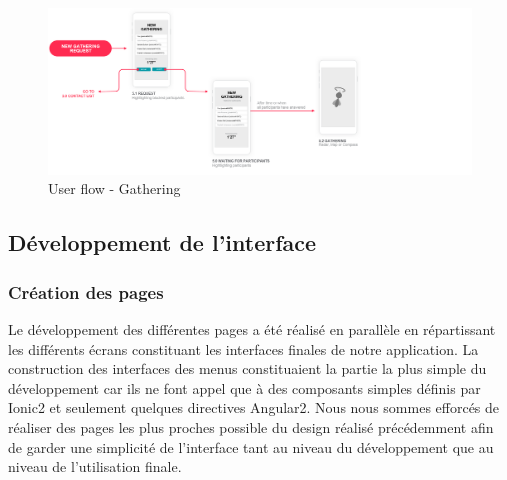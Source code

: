 \documentclass[french]{article}
\begin{document}
	\begin{figure}[H]
		\centering
		\includegraphics[scale=0.6]{../user-flow/user-flow-5.png}
		\caption{User flow - Gathering}
		\label{User flow - Gathering}
	\end{figure}
	
	
	\subsection{Développement de l'interface}
	\subsubsection{Création des pages}
	
	Le développement des différentes pages a été réalisé en parallèle en répartissant les différents écrans constituant les interfaces finales de notre application.
	La construction des interfaces des menus constituaient la partie la plus simple du développement car ils ne font appel que à des composants simples définis par Ionic2 et seulement quelques directives Angular2. 
	Nous nous sommes efforcés de réaliser des pages les plus proches possible du design réalisé précédemment afin de garder une simplicité de l'interface tant au niveau du développement que au niveau de l'utilisation finale. 
	
\end{document}

